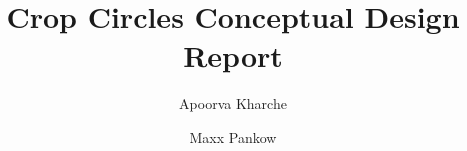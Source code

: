 \@makechapterheada\titlepage  %
\title{Crop Circles Conceptual Design Report}
\author{Apoorva Kharche \and Maxx Pankow}



\notice

\maketitle
